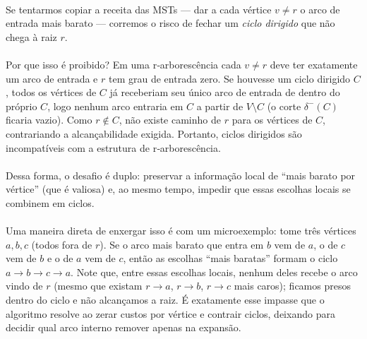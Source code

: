 \documentclass[12pt,a4paper]{article}
\begin{document}
\paragraph{}
Se tentarmos copiar a receita das MSTs — dar a cada vértice \(v\neq r\) o arco de entrada mais barato — corremos o risco de fechar um \emph{ciclo dirigido} que não chega à raiz \(r\). 

\paragraph{}
Por que isso é proibido? Em uma r‑arborescência cada \(v\neq r\) deve ter exatamente um arco de entrada e \(r\) tem grau de entrada zero. Se houvesse um ciclo dirigido \(C\), todos os vértices de \(C\) já receberiam seu único arco de entrada de dentro do próprio \(C\), logo nenhum arco entraria em \(C\) a partir de \(V\setminus C\) (o corte \(\delta^-(C)\) ficaria vazio). Como \(r\notin C\), não existe caminho de \(r\) para os vértices de \(C\), contrariando a alcançabilidade exigida. Portanto, ciclos dirigidos são incompatíveis com a estrutura de r‑arborescência.

\paragraph{}
Dessa forma, o desafio é duplo: preservar a informação local de “mais barato por vértice” (que é valiosa) e, ao mesmo tempo, impedir que essas escolhas locais se combinem em ciclos. 

\paragraph{}
Uma maneira direta de enxergar isso é com um microexemplo: tome três vértices \(a,b,c\) (todos fora de \(r\)). Se o arco mais barato que entra em \(b\) vem de \(a\), o de \(c\) vem de \(b\) e o de \(a\) vem de \(c\), então as escolhas “mais baratas” formam o ciclo \(a\to b\to c\to a\). Note que, entre essas escolhas locais, nenhum deles recebe o arco vindo de \(r\) (mesmo que existam \(r\to a\), \(r\to b\), \(r\to c\) mais caros); ficamos presos dentro do ciclo e não alcançamos a raiz. É exatamente esse impasse que o algoritmo resolve ao zerar custos por vértice e contrair ciclos, deixando para decidir qual arco interno remover apenas na expansão.
\end{document}
